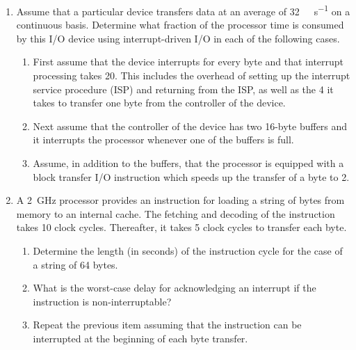 \documentclass[12pt]{article}
\begin{document}

	\begin{enumerate}[itemsep=3em]
		\item{Assume that a particular device transfers data at an average of \SI[per-mode=symbol]{32}{\kilo\byte\per\s} on a continuous basis. Determine what fraction of the processor time is consumed by this I/O device using interrupt-driven I/O in each of the following cases.}\\	
		\begin{enumerate}[itemsep=3em]
			\item{First assume that the device interrupts for every byte and that interrupt processing takes \SI{20}{\mics}.  This includes the overhead of setting up the interrupt service procedure (ISP) and returning from the ISP, as well as the \SI{4}{\mics} it takes to transfer one byte from the controller of the device.}
		
			\item{ Next assume that the controller of the device has two 16-byte buffers and it interrupts the processor whenever one of the buffers is full.}
		
			\item{Assume, in addition to the buffers, that the processor is equipped with a block transfer I/O instruction which speeds up the transfer of a byte to \SI{2}{\mics}.}
		\end{enumerate}
	
		\item{A \SI{2}{\giga \hertz} processor provides an instruction for loading a string of bytes from memory to an internal cache. The fetching and decoding of the instruction takes 10 clock cycles. Thereafter, it takes 5 clock cycles to transfer each byte.}\\
		\begin{enumerate}[itemsep=3em]
			\item{Determine the length (in seconds) of the instruction cycle for the case of a string of 64 bytes.}
		
			\item{What is the worst-case delay for acknowledging an interrupt if the instruction is non-interruptable?}
		
			\item{Repeat the previous item assuming that the instruction can be interrupted at the beginning of each byte transfer.}
		\end{enumerate}
	\end{enumerate}
\end{document}
